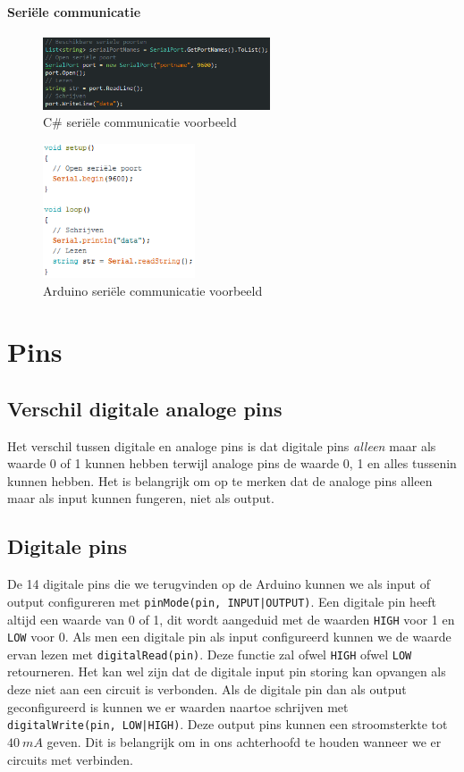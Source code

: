 \documentclass[11pt]{report}
\newcommand{\code}[1]{{\texttt{#1}}}
\newcommand{\lbr}{\hfill\break}
\begin{document}
\paragraph{Seriële communicatie}\lbr
\begin{figure}[H]
  \centering
  \includegraphics[width=0.6\textwidth]{csharp_serial.png}
  \caption{C\# seriële communicatie voorbeeld}
\end{figure}
\begin{figure}[H]
  \centering
  \includegraphics[width=0.4\textwidth]{arduino_serial.png}
  \caption{Arduino seriële communicatie voorbeeld}
\end{figure}



\section{Pins}
\subsection{Verschil digitale analoge pins}
Het verschil tussen digitale en analoge pins is dat digitale pins \textit{alleen} maar als waarde 0 of 1 kunnen hebben terwijl analoge pins de waarde 0, 1 en alles tussenin kunnen hebben. Het is belangrijk om op te merken dat de analoge pins alleen maar als input kunnen fungeren, niet als output.
\subsection{Digitale pins}
De 14 digitale pins die we terugvinden op de Arduino kunnen we als input of output configureren met \code{pinMode(pin, INPUT|OUTPUT)}. Een digitale pin heeft altijd een waarde van 0 of 1, dit wordt aangeduid met de waarden \code{HIGH} voor 1 en \code{LOW} voor 0. Als men een digitale pin als input configureerd kunnen we de waarde ervan lezen met \code{digitalRead(pin)}. Deze functie zal ofwel \code{HIGH} ofwel \code{LOW} retourneren. Het kan wel zijn dat de digitale input pin storing kan opvangen als deze niet aan een circuit is verbonden. Als de digitale pin dan als output geconfigureerd is kunnen we er waarden naartoe schrijven met \code{digitalWrite(pin, LOW|HIGH)}. Deze output pins kunnen een stroomsterkte tot $40\ mA$ geven. Dit is belangrijk om in ons achterhoofd te houden wanneer we er circuits met verbinden.
\end{document}

